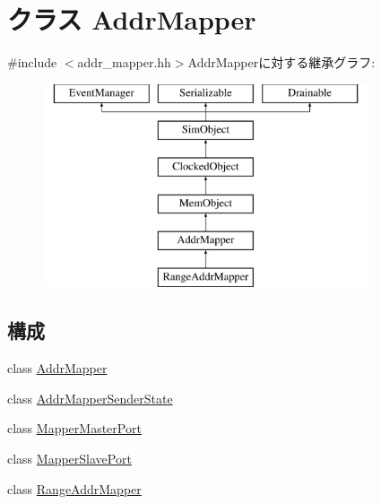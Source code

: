 \hypertarget{classAddrMapper}{
\section{クラス AddrMapper}
\label{classAddrMapper}
}


{\ttfamily \#include $<$addr\_\-mapper.hh$>$}AddrMapperに対する継承グラフ:\begin{figure}[H]
\begin{center}
\leavevmode
\includegraphics[height=6cm]{classAddrMapper}
\end{center}
\end{figure}
\subsection*{構成}
\begin{DoxyCompactItemize}
\item 
class \hyperlink{classAddrMapper_1_1AddrMapper}{AddrMapper}
\item 
class \hyperlink{classAddrMapper_1_1AddrMapperSenderState}{AddrMapperSenderState}
\item 
class \hyperlink{classAddrMapper_1_1MapperMasterPort}{MapperMasterPort}
\item 
class \hyperlink{classAddrMapper_1_1MapperSlavePort}{MapperSlavePort}
\item 
class \hyperlink{classAddrMapper_1_1RangeAddrMapper}{RangeAddrMapper}
\end{DoxyCompactItemize}
